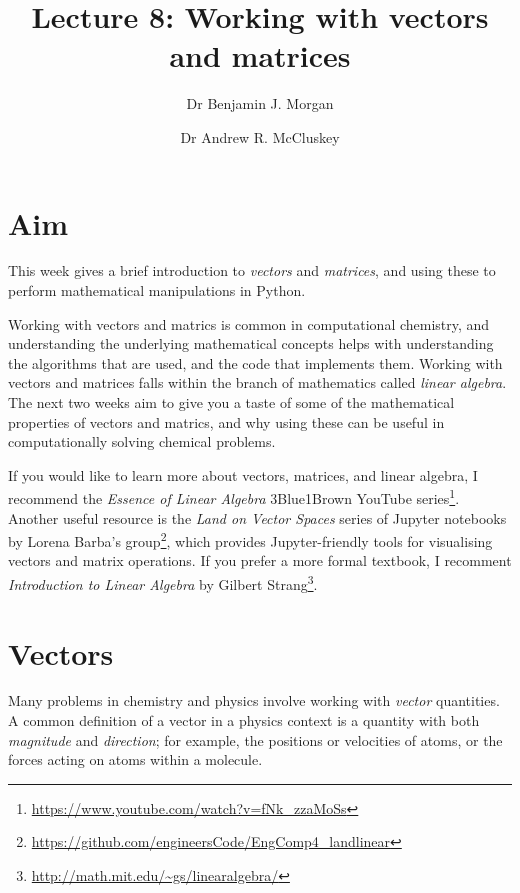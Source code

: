 \documentclass[a4paper]{article}
\title{Lecture 8: Working with vectors and matrices}
\author[1]{Dr Benjamin J. Morgan}
\author[1,2]{Dr Andrew R. McCluskey}
\affil[1]{Department of Chemistry, University of Bath, email: b.j.morgan@bath.ac.uk}
\affil[2]{Diamond Light Source, email: andrew.mccluskey@diamond.ac.uk}
\begin{document}
\maketitle

\section*{Aim}
This week gives a brief introduction to \emph{vectors} and \emph{matrices}, and using these to perform mathematical manipulations in Python. 

Working with vectors and matrics is common in computational chemistry, and understanding the underlying mathematical concepts helps with understanding the algorithms that are used, and the code that implements them. Working with vectors and matrices falls within the branch of mathematics called \emph{linear algebra}. The next two weeks aim to give you a taste of some of the mathematical properties of vectors and matrics, and why using these can be useful in computationally solving chemical problems. 

If you would like to learn more about vectors, matrices, and linear algebra, I recommend the \emph{Essence of Linear Algebra} 3Blue1Brown YouTube series\footnote{\url{https://www.youtube.com/watch?v=fNk_zzaMoSs}}. Another useful resource is the \emph{Land on Vector Spaces} series of Jupyter notebooks by Lorena Barba's group\footnote{\url{https://github.com/engineersCode/EngComp4\_landlinear}}, which provides Jupyter-friendly tools for visualising vectors and matrix operations. If you prefer a more formal textbook, I recomment \emph{Introduction to Linear Algebra} by Gilbert Strang\footnote{\url{http://math.mit.edu/\~gs/linearalgebra/}}.

\section{Vectors}
Many problems in chemistry and physics involve working with \emph{vector} quantities. A common definition of a vector in a physics context is a quantity with both \emph{magnitude} and \emph{direction}; for example, the positions or velocities of atoms, or the forces acting on atoms within a molecule.
\end{document}

